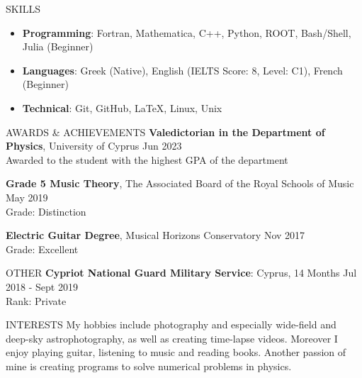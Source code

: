 \documentclass{resume} %
\begin{document}
        \bigbreak

        \begin{rSection}{SKILLS}
                \begin{itemize}
                        \itemsep -3pt {} 
                        \item \textbf{Programming}: Fortran, Mathematica, C++, Python, ROOT, Bash/Shell, Julia (Beginner)
                        \item \textbf{Languages}: Greek (Native), English (IELTS Score: 8, Level: C1), French (Beginner)
                        \item \textbf{Technical}: Git, GitHub, \LaTeX, Linux, Unix
                \end{itemize}
        \end{rSection}

        \bigbreak

        \begin{rSection}{AWARDS \& ACHIEVEMENTS}
                {\bf Valedictorian in the Department of Physics}, University of Cyprus \hfill Jun 2023\\
                Awarded to the student with the highest GPA of the department
                
                {\bf Grade 5 Music Theory}, The Associated Board of the Royal Schools of Music \hfill May 2019\\
                Grade: Distinction
                
                {\bf Electric Guitar Degree}, Musical Horizons Conservatory \hfill Nov 2017\\
                Grade: Excellent
        \end{rSection} 

        \bigbreak

        \begin{rSection}{OTHER}
                {\bf Cypriot National Guard Military Service}: Cyprus, 14 Months \hfill {Jul 2018 - Sept 2019}\\
                Rank: Private
        \end{rSection}

        \bigbreak

        \begin{rSection}{INTERESTS} 
                My hobbies include photography and especially wide-field and deep-sky astrophotography, as well as creating time-lapse videos.
                Moreover I enjoy playing guitar, listening to music and reading books.
                Another passion of mine is creating programs to solve numerical problems in physics.
        \end{rSection}
\end{document}
